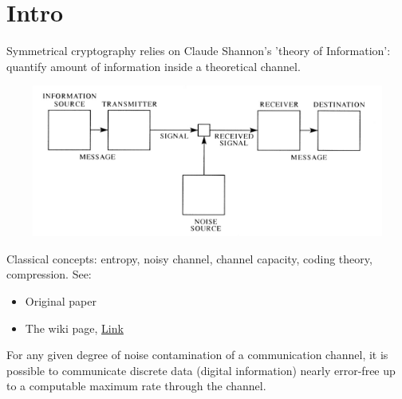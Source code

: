 \section{Intro}
\label{SymmetricalIntro}

Symmetrical cryptography relies on Claude Shannon's 'theory of Information':
quantify amount of information inside a theoretical channel.
\begin{center}		
	\includegraphics[width=18cm,height=5cm]{images/shannon.jpg}
\end{center}
Classical concepts: entropy, noisy channel, channel capacity, coding theory, compression. See:
\begin{itemize}
	\item Original paper  
	\item The wiki page, \href{https://en.wikipedia.org/wiki/Information_theory}{Link}
\end{itemize}
\begin{mythm}
For any given degree of noise contamination of a communication channel, it is possible to communicate discrete data (digital information) nearly error-free up to a computable maximum rate through the channel.
\end{mythm}